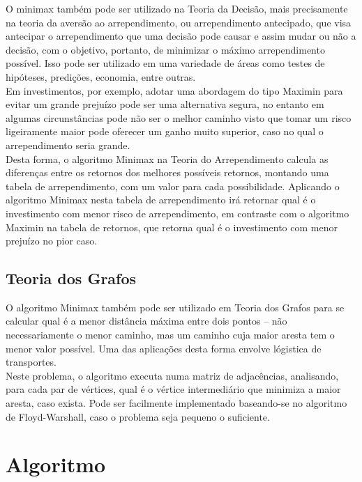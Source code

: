 \documentclass[]{article}
\begin{document}
O minimax também pode ser utilizado na Teoria da Decisão, mais precisamente na teoria da aversão ao arrependimento, ou arrependimento antecipado, que visa antecipar o arrependimento que uma decisão pode causar e assim mudar ou não a decisão, com o objetivo, portanto, de minimizar o máximo arrependimento possível. Isso pode ser utilizado em uma variedade de áreas como testes de hipóteses, predições, economia, entre outras. \cite{regret} \\

Em investimentos, por exemplo, adotar uma abordagem do tipo Maximin para evitar um grande prejuízo pode ser uma alternativa segura, no entanto em algumas circunstâncias pode não ser o melhor caminho visto que tomar um risco ligeiramente maior pode oferecer um ganho muito superior, caso no qual o arrependimento seria grande. \\

Desta forma, o algoritmo Minimax na Teoria do Arrependimento calcula as diferenças entre os retornos dos melhores possíveis retornos, montando uma tabela de arrependimento, com um valor para cada possibilidade. Aplicando o algoritmo Minimax nesta tabela de arrependimento irá retornar qual é o investimento com menor risco de arrependimento, em contraste com o algoritmo Maximin na tabela de retornos, que retorna qual é o investimento com menor prejuízo no pior caso. \\
	
\subsection{Teoria dos Grafos}

O algoritmo Minimax também pode ser utilizado em Teoria dos Grafos para se calcular qual é a menor distância máxima entre dois pontos -- não necessariamente o menor caminho, mas um caminho cuja maior aresta tem o menor valor possível. Uma das aplicações desta forma envolve lógistica de transportes. \cite{fw} \\

Neste problema, o algoritmo executa numa matriz de adjacências, analisando, para cada par de vértices, qual é o vértice intermediário que minimiza a maior aresta, caso exista. Pode ser facilmente implementado baseando-se no algoritmo de Floyd-Warshall, caso o problema seja pequeno o suficiente. \\

\section{Algoritmo}
\end{document}
